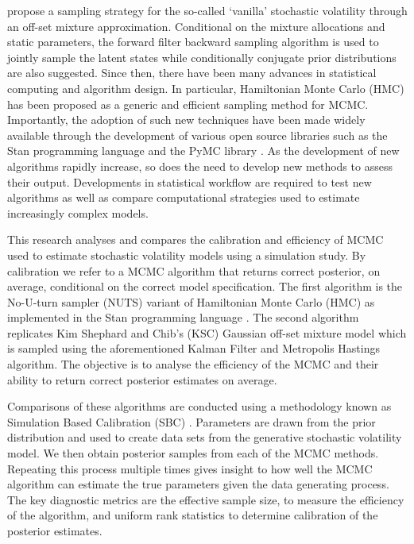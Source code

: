 \documentclass[12pt, a4paper]{article}
\begin{document}
    \citet{kim1998stochastic} propose a sampling strategy for the so-called `vanilla' stochastic volatility through an off-set mixture approximation. Conditional on the mixture allocations and static parameters, the forward filter backward sampling algorithm \citep{carter1994gibbs, fruhwirth1995bayesian} is used to jointly sample the latent states while conditionally  conjugate prior distributions are also suggested.  Since then, there have been many advances in statistical computing and algorithm design. In particular, Hamiltonian Monte Carlo (HMC) has been proposed as a generic and efficient sampling method for MCMC. Importantly, the adoption of such new techniques have been made widely available through the development of various open source libraries such as the Stan programming language \citep{stan} and the PyMC library \citep{pymc2023}. As the development of new algorithms rapidly increase, so does the need to develop new methods to assess their output. Developments in statistical workflow are required to test new algorithms as well as compare computational strategies used to estimate increasingly complex models.

    This research analyses and compares the calibration and efficiency of MCMC used to estimate stochastic volatility models using a simulation study. By calibration we refer to a MCMC algorithm that returns correct posterior, on average, conditional on the correct model specification. The first algorithm is the No-U-turn sampler (NUTS) variant of Hamiltonian Monte Carlo (HMC) as implemented in the Stan programming language \citep{hoffman2014no, betancourt2017conceptual, stan}. The second algorithm replicates Kim Shephard and Chib's (KSC) Gaussian off-set mixture model which is sampled using the aforementioned Kalman Filter and Metropolis Hastings algorithm. The objective is to analyse the efficiency of the MCMC and their ability to return correct posterior estimates on average.

    Comparisons of these algorithms are conducted using a methodology known as Simulation Based Calibration (SBC) \citep{talts2020validating}. Parameters are drawn from the prior distribution and used to create data sets from the generative stochastic volatility model. We then obtain posterior samples from each of the MCMC methods. Repeating this process multiple times gives insight to how well the MCMC algorithm can estimate the true parameters given the data generating process. The key diagnostic metrics are the effective sample size, to measure the efficiency of the algorithm, and uniform rank statistics to determine calibration of the posterior estimates. 
\end{document}

